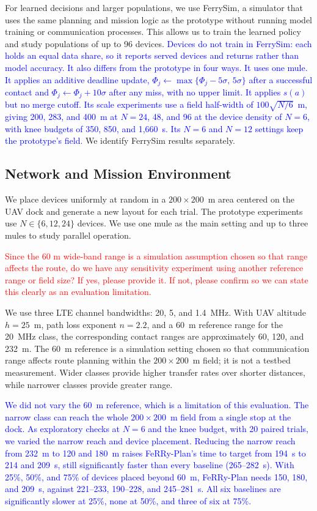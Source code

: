 \documentclass[conference]{IEEEtran}
\newcommand{\sysname}{FeRRy}
\begin{document}
For learned decisions and larger populations, we use FerrySim, a simulator that
uses the same planning and mission logic as the prototype without running model
training or communication processes. This allows us to train the learned policy
and study populations of up to 96 devices. \textcolor{blue}{Devices do not train in FerrySim: each holds an equal data share, so it reports
served devices and returns rather than model accuracy. It also differs from the
prototype in four ways. It uses one mule. It applies an additive deadline update,
$\Phi_j\leftarrow\max\{\Phi_j-5\sigma,\,5\sigma\}$ after a successful contact and
$\Phi_j\leftarrow\Phi_j+10\sigma$ after any miss, with no upper limit. It applies
$s(a)$ but no merge cutoff. Its scale experiments use a field half-width of
$100\sqrt{N/6}$~m, giving 200, 283, and 400~m at $N=24$, 48, and 96 at the device
density of $N=6$, with knee budgets of 350, 850, and 1,660~s. Its $N=6$ and $N=12$
settings keep the prototype's field.} We identify FerrySim results separately.

\subsection{Network and Mission Environment}
\label{sec:environment}

We place devices uniformly at random in a \(200\times200\)~m area centered on
the UAV dock and generate a new layout for each trial. The prototype experiments
use \(N\in\{6,12,24\}\) devices. We use one mule as the main setting and up to
three mules to study parallel operation.

\textcolor{red}{Since the 60 m wide-band range is a simulation assumption chosen so that range affects the route, do we have any sensitivity experiment using another reference range or field size? If yes, please provide it. If not, please confirm so we can state this clearly as an evaluation limitation.}

We use three LTE channel bandwidths: 20, 5, and 1.4~MHz. With UAV altitude
\(h=25\)~m, path loss exponent \(n=2.2\), and a 60~m reference range for the
20~MHz class, the corresponding contact ranges are approximately 60, 120, and
232~m. The 60~m reference is a simulation setting chosen so that communication
range affects route planning within the \(200\times200\)~m field; it is not a
testbed measurement. Wider classes provide higher transfer rates over shorter
distances, while narrower classes provide greater range.

\textcolor{blue}{We did not vary the 60~m reference, which is a limitation of this evaluation. The
narrow class can reach the whole \(200\times200\)~m field from a single stop at
the dock. As exploratory checks at
\(N=6\) and the knee budget, with 20 paired trials, we varied the narrow reach and
device placement. Reducing the narrow reach from 232~m to 120 and 180~m raises
\sysname{}-Plan's time to target from 194~s to 214 and 209~s, still significantly
faster than every baseline (265--282~s). With 25\%, 50\%, and 75\% of devices
placed beyond 60~m, \sysname{}-Plan needs 150, 180, and 209~s, against 221--233,
190--228, and 245--281~s. All six baselines are significantly slower at 25\%, none
at 50\%, and three of six at 75\%.}
\end{document}
